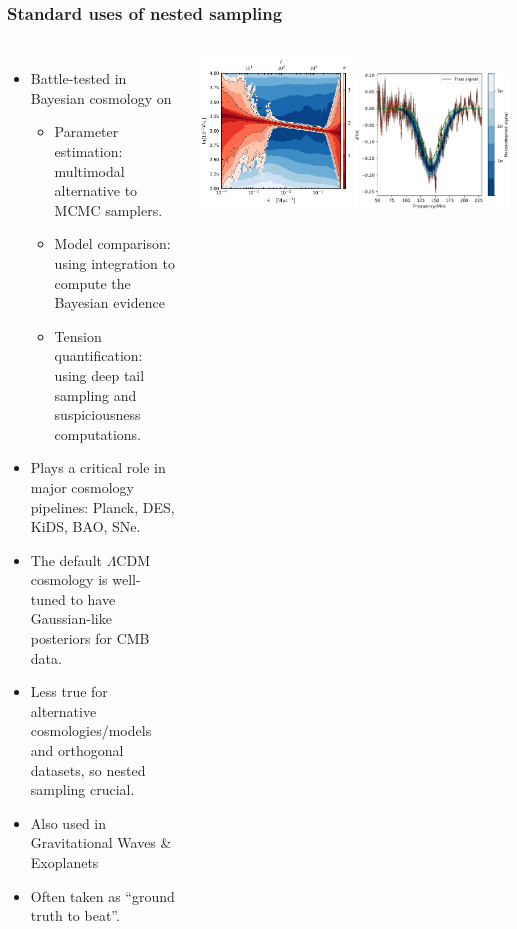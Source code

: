 \documentclass[aspectratio=169]{beamer}
\begin{document}
\begin{frame}
    \frametitle{Standard uses of nested sampling}
    \begin{columns}
        \vspace{-10pt}
        \begin{itemize}
            \item Battle-tested in Bayesian cosmology on
                \begin{itemize}
                    \item Parameter estimation: multimodal alternative to MCMC samplers.
                    \item Model comparison: using integration to compute the Bayesian evidence
                    \item Tension quantification: using deep tail sampling and suspiciousness computations.
                \end{itemize}
            \item Plays a critical role in major cosmology pipelines: Planck, DES, KiDS, BAO, SNe.
            \item The default $\Lambda$CDM cosmology is well-tuned to have Gaussian-like posteriors for CMB data. 
            \item Less true for alternative cosmologies/models and orthogonal datasets, so nested sampling crucial.
            \item Also used in Gravitational Waves \& Exoplanets
            \item Often taken as ``ground truth to beat''.
        \end{itemize}
        \includegraphics[width=0.49\textwidth]{figures/pps_both}
        \includegraphics[width=0.49\textwidth]{figures/reach_fit-cropped.pdf}

\end{columns}
\end{frame}
\end{document}
